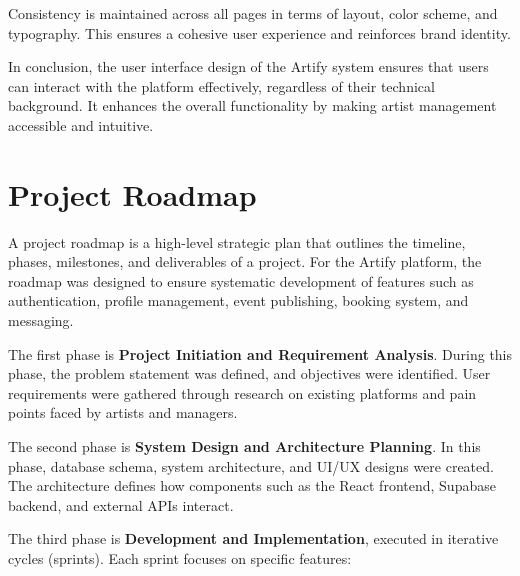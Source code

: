 \documentclass[12pt,a4paper]{report}
\begin{document}
Consistency is maintained across all pages in terms of layout, color scheme, and typography. This ensures a cohesive user experience and reinforces brand identity.

In conclusion, the user interface design of the Artify system ensures that users can interact with the platform effectively, regardless of their technical background. It enhances the overall functionality by making artist management accessible and intuitive.

\setcounter{chapter}{5}
\clearpage
\thispagestyle{empty}

\noindent
{}

\clearpage
{}
\setcounter{section}{0}
\section{Project Roadmap}

A project roadmap is a high-level strategic plan that outlines the timeline, phases, milestones, and deliverables of a project. For the Artify platform, the roadmap was designed to ensure systematic development of features such as authentication, profile management, event publishing, booking system, and messaging.

The first phase is \textbf{Project Initiation and Requirement Analysis}. During this phase, the problem statement was defined, and objectives were identified. User requirements were gathered through research on existing platforms and pain points faced by artists and managers.

The second phase is \textbf{System Design and Architecture Planning}. In this phase, database schema, system architecture, and UI/UX designs were created. The architecture defines how components such as the React frontend, Supabase backend, and external APIs interact.

The third phase is \textbf{Development and Implementation}, executed in iterative cycles (sprints). Each sprint focuses on specific features:
\end{document}
